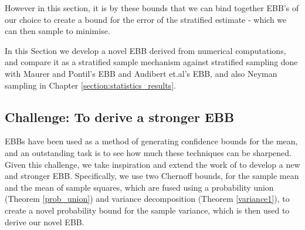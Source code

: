 However in this section, it is by these bounds that we can bind together EBB's of our choice to create a bound for the error of the stratified estimate - which we can then sample to minimise.

In this Section we develop a novel EBB derived from numerical computations, and compare it as a stratified sample mechanism against stratified sampling done with Maurer and Pontil's EBB and Audibert et.al's EBB, and also Neyman sampling in Chapter \ref{section:statistics_results}.


\subsection{Challenge: To derive a stronger EBB}

EBBs have been used as a method of generating confidence bounds for the mean, and an outstanding task is to see how much these techniques can be sharpened.
Given this challenge, we take inspiration and extend the work of \cite{Maurer50empiricalbernstein} to develop a new and stronger EBB.
Specifically, we use two Chernoff bounds, for the sample mean and the mean of sample squares, which are fused using a probability union (Theorem \ref{prob_union}) and variance decomposition (Theorem \ref{variance1}),
to create a novel probability bound for the sample variance, which is then used to derive our novel EBB.







